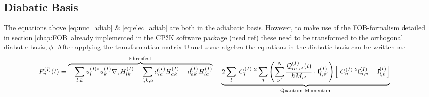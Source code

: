 \subsection{Diabatic Basis}
The equations above \eqref{eq:nuc_adiab} \& \eqref{eq:elec_adiab} are both in the adiabatic basis. However, to make use of the FOB-formalism detailed in section \ref{chap:FOB} already implemented in the CP2K software package (need ref) these need to be transformed to the orthogonal diabatic basis, $\phi$. After applying the transformation matrix $\mathbb{U}$ and some algebra the equations in the diabatic basis can be written as:
\begin{dmath}
{ F_{v}^{(I)}(t)} =
\overbrace{ -\sum_{l,k} u_{l}^{(I) *} u_{k}^{(I)} \nabla_{v} H_{lk}^{(I)} - \sum_{l,k,a} d_{la}^{(I)}H_{ak}^{(I)} - d_{ak}^{(I)}H_{la}^{(I)}}^{\text{Ehrenfest}}
\\
 - \underbrace{2 \sum_{l} |C_{l}^{(I)}|^2 \sum_{n} \left( \sum^{N}_{\nu'} \frac{\mathcal{Q}^{(I)}_{ln,v'}(t)}{\hbar M_{v'}} \cdot \textbf{f}^{(I)}_{l,v'}\right)\left[  |C_{n}^{(I)}|^{2} \textbf{f}^{(I)}_{n,v} - \textbf{f}^{(I)}_{l,v} \right]}_{\text{Quantum Momentum}}
 \label{eq:diab_force}
\end{dmath}

